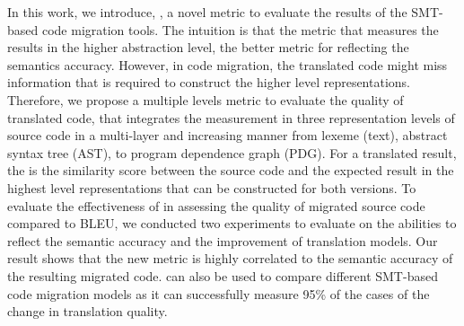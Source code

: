 

In this work, we introduce, {\model}, a novel metric to evaluate the
results of the SMT-based code migration tools.  The intuition is that
the metric that measures the results in the higher abstraction level,
the better metric for reflecting the semantics accuracy. However, in
code migration, the translated code might miss information that is
required to construct the higher level representations. Therefore, we
propose a multiple levels metric to evaluate the quality of translated
code, that integrates the measurement in three representation levels
of source code in a multi-layer and increasing manner from lexeme
(text), abstract syntax tree (AST), to program dependence
graph (PDG). For a translated result, the {\model} is the similarity
score between the source code and the expected result in the highest
level representations that can be constructed for both versions. To
evaluate the effectiveness of {\model} in assessing the quality of
migrated source code compared to BLEU, we conducted two experiments to
evaluate {\model} on the abilities to reflect the semantic accuracy
and the improvement of translation models. Our result shows that the
new metric {\model} is highly correlated to the semantic accuracy of
the resulting migrated code. {\model} can also be used to compare
different SMT-based code migration models as it can successfully
measure 95\% of the cases of the change in translation quality.

